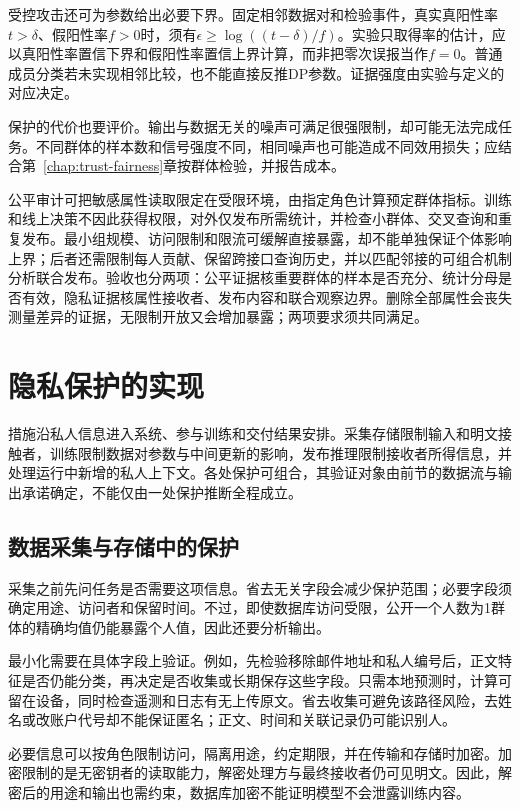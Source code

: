受控攻击还可为参数给出必要下界。固定相邻数据对和检验事件，真实真阳性率$t>\delta$、假阳性率$f>0$时，须有$\epsilon\geq\log((t-\delta)/f)$。实验只取得率的估计，应以真阳性率置信下界和假阳性率置信上界计算，而非把零次误报当作$f=0$。普通成员分类若未实现相邻比较，也不能直接反推DP参数。证据强度由实验与定义的对应决定。

保护的代价也要评价。输出与数据无关的噪声可满足很强限制，却可能无法完成任务。不同群体的样本数和信号强度不同，相同噪声也可能造成不同效用损失；应结合第~\ref{chap:trust-fairness}章按群体检验，并报告成本。

公平审计可把敏感属性读取限定在受限环境，由指定角色计算预定群体指标。训练和线上决策不因此获得权限，对外仅发布所需统计，并检查小群体、交叉查询和重复发布。最小组规模、访问限制和限流可缓解直接暴露，却不能单独保证个体影响上界；后者还需限制每人贡献、保留跨接口查询历史，并以匹配邻接的可组合机制分析联合发布。验收也分两项：公平证据核重要群体的样本是否充分、统计分母是否有效，隐私证据核属性接收者、发布内容和联合观察边界。删除全部属性会丧失测量差异的证据，无限制开放又会增加暴露；两项要求须共同满足。

\section{隐私保护的实现}
\label{sec:privacy-use}

措施沿私人信息进入系统、参与训练和交付结果安排。采集存储限制输入和明文接触者，训练限制数据对参数与中间更新的影响，发布推理限制接收者所得信息，并处理运行中新增的私人上下文。各处保护可组合，其验证对象由前节的数据流与输出承诺确定，不能仅由一处保护推断全程成立。

\subsection{数据采集与存储中的保护}
\label{sec:privacy-collection}

采集之前先问任务是否需要这项信息。省去无关字段会减少保护范围；必要字段须确定用途、访问者和保留时间。不过，即使数据库访问受限，公开一个人数为1群体的精确均值仍能暴露个人值，因此还要分析输出。

最小化需要在具体字段上验证。例如，先检验移除邮件地址和私人编号后，正文特征是否仍能分类，再决定是否收集或长期保存这些字段。只需本地预测时，计算可留在设备，同时检查遥测和日志有无上传原文。省去收集可避免该路径风险，去姓名或改账户代号却不能保证匿名；正文、时间和关联记录仍可能识别人。

必要信息可以按角色限制访问，隔离用途，约定期限，并在传输和存储时加密。加密限制的是无密钥者的读取能力，解密处理方与最终接收者仍可见明文。因此，解密后的用途和输出也需约束，数据库加密不能证明模型不会泄露训练内容。

